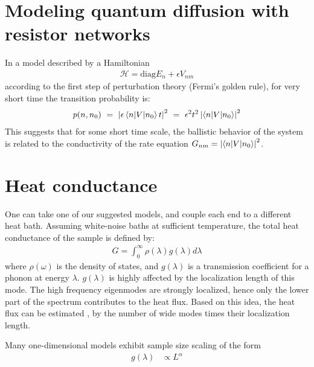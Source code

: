 \section{Modeling quantum diffusion with resistor networks}


In a model described by a Hamiltonian 
%
\begin{align}
\mathcal{H} = \textrm{diag}{E_n} + \epsilon {V_{nm}}
\end{align}
%
according to the first step of perturbation theory (Fermi's golden rule),
for very short time the transition probability is:
%
\begin{align}
 p(n, n_0)\ =\ \left| \epsilon \bra n| V |n_0\ket t\right|^2 \ = \ \epsilon^2 t^2\left| \bra n| V |n_0\ket \right|^2
\end{align}
%
This suggests that for some short time scale, the ballistic behavior
of the system is related to the conductivity of the rate equation $G_{nm} = \left| \left\langle n| V |n_0\right\rangle \right|^2$.





\section{Heat conductance}\label{sec:heat}

One can take one of our suggested models, and couple each end to a different heat bath.
Assuming white-noise baths at sufficient temperature, the total heat conductance of the sample is defined by:
\begin{align}
G = \int_0^\infty \rho(\lambda) g(\lambda) d\lambda
\end{align}
where $\rho(\omega)$ is the density of states, and $g(\lambda)$ is 
a transmission coefficient for a phonon at energy $\lambda$.
$g(\lambda)$ is highly affected by the localization length of this mode\cite{tong_wave_1999}.
The high frequency eigenmodes are strongly localized, hence only the
lower part of the spectrum contributes to the heat flux. Based on this idea,
the heat flux can be estimated \cite{lepri_thermal_2001,lepri_thermal_2003,bodyfelt_unpub},
by the number of wide modes times their localization length.

 
Many one-dimensional models 
\cite{narayan_anomalous_2002,dhar_heat_2001,lepri_anomalous_1998,savin_heat_2002} 
exhibit sample size scaling of the form
%
\begin{align}
g(\lambda)    &\propto L^\alpha
\end{align}

